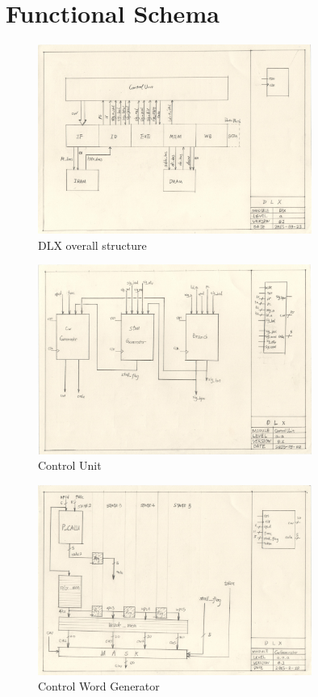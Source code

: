 \chapter[Functional Schema]{Functional Schema}
\begin{figure}[Ht]
    \centering
    \includegraphics[width=0.8\textwidth]{fig/dlx.jpg}
    \caption{DLX overall structure}
    \label{fig:dlx}
\end{figure}
\begin{figure}[Ht]
    \centering
    \includegraphics[width=0.8\textwidth]{fig/cu.jpg}
    \caption{Control Unit}
    \label{fig:cu}
\end{figure}
\begin{figure}[Ht]
    \centering
    \includegraphics[width=0.8\textwidth]{fig/cg.jpg}
    \caption{Control Word Generator}
    \label{fig:cg}
\end{figure}
